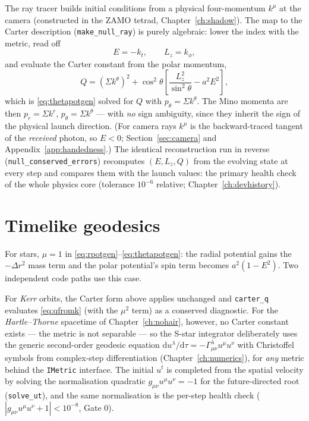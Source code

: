 The ray tracer builds initial conditions from a physical four-momentum
$k^\mu$ at the camera (constructed in the ZAMO tetrad,
Chapter~\ref{ch:shadow}). The map to the Carter description
(\texttt{make\_null\_ray}) is purely algebraic: lower the index with the
metric, read off
\begin{equation}
E = -k_t, \qquad L_z = k_\phi,
\end{equation}
and evaluate the Carter constant from the polar momentum,
\begin{equation}
Q = (\Sigma k^\theta)^2
+ \cos^2\theta\left[\frac{L_z^2}{\sin^2\theta} - a^2E^2\right],
\label{eq:qfromk}
\end{equation}
which is \eqref{eq:thetapotgen} solved for $Q$ with
$p_\theta = \Sigma k^\theta$. The Mino momenta are then
$p_r = \Sigma k^r$, $p_\theta = \Sigma k^\theta$ — with \emph{no} sign
ambiguity, since they inherit the sign of the physical launch direction.
(For camera rays $k^\mu$ is the backward-traced tangent of the
\emph{received} photon, so $E < 0$; Section~\ref{sec:camera} and
Appendix~\ref{app:handedness}.)
The identical reconstruction run in reverse
(\texttt{null\_conserved\_errors}) recomputes $(E, L_z, Q)$ from the
evolving state at every step and compares them with the launch values:
the primary health check of the whole physics core (tolerance $10^{-6}$
relative; Chapter~\ref{ch:devhistory}).

\section{Timelike geodesics}
\label{sec:timelike}

For stars, $\mu = 1$ in
\eqref{eq:rpotgen}--\eqref{eq:thetapotgen}: the radial potential gains
the $-\Delta r^2$ mass term and the polar potential's spin term becomes
$a^2(1 - E^2)$. Two independent code paths use this case.

For \emph{Kerr} orbits, the Carter form above applies unchanged and
\texttt{carter\_q} evaluates \eqref{eq:qfromk} (with the $\mu^2$ term)
as a conserved diagnostic. For the \emph{Hartle--Thorne} spacetime of
Chapter~\ref{ch:nohair}, however, no Carter constant exists — the metric
is not separable — so the S-star integrator deliberately uses the
generic second-order geodesic equation
$\mathrm{d}u^\lambda/\mathrm{d}\tau =
-\Gamma^\lambda_{\mu\nu}u^\mu u^\nu$ with Christoffel symbols from
complex-step differentiation (Chapter~\ref{ch:numerics}), for \emph{any}
metric behind the \texttt{IMetric} interface. The initial $u^t$ is
completed from the spatial velocity by solving the normalisation
quadratic $g_{\mu\nu}u^\mu u^\nu = -1$ for the future-directed root
(\texttt{solve\_ut}), and the same normalisation is the per-step health
check ($|g_{\mu\nu}u^\mu u^\nu + 1| < 10^{-8}$, Gate 0).

